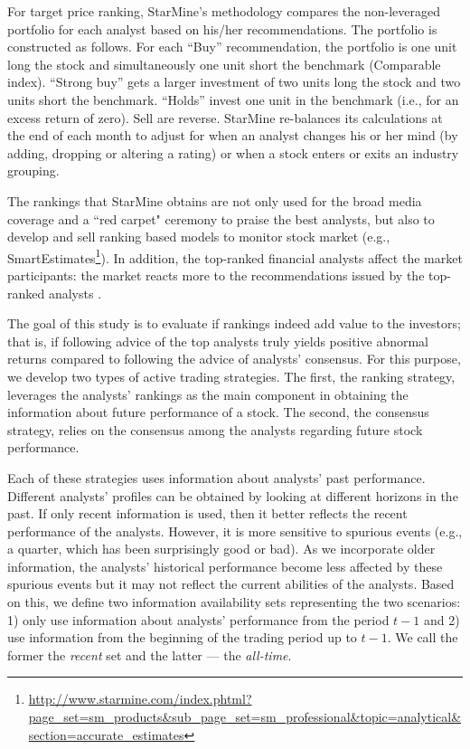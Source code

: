 \documentclass{article}\usepackage[]{graphicx}\usepackage[]{color}
\newcommand{\naive}{\textit{recent}}
\newcommand{\default}{\textit{all-time}}
\begin{document}
For target price ranking, StarMine's methodology compares the non-leveraged portfolio for each analyst based on his/her recommendations. The portfolio is constructed as follows. For each ``Buy'' recommendation, the portfolio is one unit long the stock and simultaneously one unit short the benchmark (Comparable index). ``Strong buy'' gets a larger investment of two units long the stock and two units short the benchmark. ``Holds'' invest one unit in the benchmark (i.e., for an excess return of zero). Sell are reverse. StarMine re-balances its calculations at the end of each month to adjust for when an analyst changes his or her mind (by adding, dropping or altering a rating) or when a stock enters or exits an industry grouping.

The rankings that StarMine obtains are not only used for the broad media coverage and a ``red carpet" ceremony to praise the best analysts, but also to develop and sell ranking based models to monitor stock market (e.g., SmartEstimates\footnote{\url{http://www.starmine.com/index.phtml?page_set=sm_products&sub_page_set=sm_professional&topic=analytical&section=accurate_estimates}}). In addition, the top-ranked financial analysts affect the market participants: the market  reacts more to the recommendations issued by the top-ranked analysts \citep{emery2009}.



The goal of this study is to evaluate if rankings indeed add value to the investors; that is, if following advice of the top analysts truly yields positive abnormal returns compared to following the advice of analysts' consensus. For this purpose, we develop two types of  active trading strategies. The first, the ranking strategy,  leverages the analysts' rankings as the main component in obtaining the information about future performance of a stock. The second, the consensus strategy, relies on the consensus among the analysts regarding future stock performance.

Each of these strategies uses information about analysts' past performance. Different analysts' profiles can be obtained by looking at different horizons in the past. If only recent information is used, then it better reflects the recent performance of the analysts. However, it is more sensitive to spurious events (e.g., a quarter, which has been surprisingly good or bad). As we incorporate older information, the analysts' historical performance become less affected by these spurious events but it may not reflect the current abilities of the analysts. Based on this, we define two information availability sets representing the two scenarios: 1) only use information about analysts' performance  from the period $t-1$ and 2) use information from the beginning of the trading period up to $t-1$. We call the former the \naive{} set and the latter --- the \default{}. 
\end{document}
